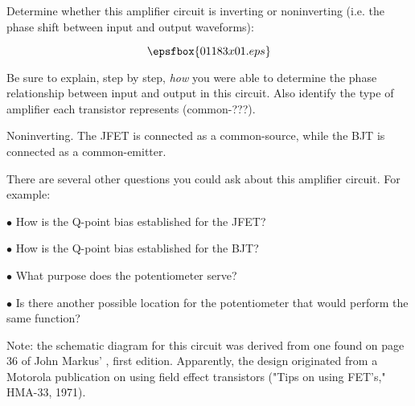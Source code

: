 

Determine whether this amplifier circuit is inverting or noninverting (i.e. the phase shift between input and output waveforms):

$$\epsfbox{01183x01.eps}$$

Be sure to explain, step by step, {\it how} you were able to determine the phase relationship between input and output in this circuit.  Also identify the type of amplifier each transistor represents (common-???).







Noninverting.  The JFET is connected as a common-source, while the BJT is connected as a common-emitter.







There are several other questions you could ask about this amplifier circuit.  For example:

\medskip
\item{$\bullet$} How is the Q-point bias established for the JFET?
\item{$\bullet$} How is the Q-point bias established for the BJT?
\item{$\bullet$} What purpose does the potentiometer serve?
\item{$\bullet$} Is there another possible location for the potentiometer that would perform the same function?
\medskip

Note: the schematic diagram for this circuit was derived from one found on page 36 of John Markus' , first edition.  Apparently, the design originated from a Motorola publication on using field effect transistors ("Tips on using FET's," HMA-33, 1971).




